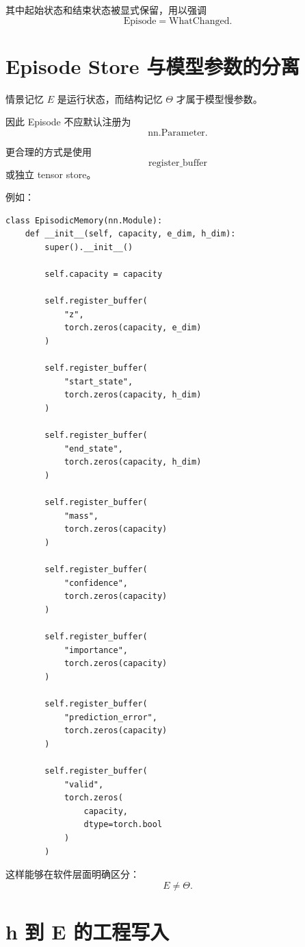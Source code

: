 其中起始状态和结束状态被显式保留，用以强调
\[
\boxed{
\mathrm{Episode}
=
\mathrm{WhatChanged}.
}
\]

\section{Episode Store 与模型参数的分离}

情景记忆 $E$ 是运行状态，而结构记忆 $\Theta$ 才属于模型慢参数。

因此 Episode 不应默认注册为
\[
\mathrm{nn.Parameter}.
\]

更合理的方式是使用
\[
\mathrm{register\_buffer}
\]
或独立 tensor store。

例如：

\begin{verbatim}
class EpisodicMemory(nn.Module):
    def __init__(self, capacity, e_dim, h_dim):
        super().__init__()

        self.capacity = capacity

        self.register_buffer(
            "z",
            torch.zeros(capacity, e_dim)
        )

        self.register_buffer(
            "start_state",
            torch.zeros(capacity, h_dim)
        )

        self.register_buffer(
            "end_state",
            torch.zeros(capacity, h_dim)
        )

        self.register_buffer(
            "mass",
            torch.zeros(capacity)
        )

        self.register_buffer(
            "confidence",
            torch.zeros(capacity)
        )

        self.register_buffer(
            "importance",
            torch.zeros(capacity)
        )

        self.register_buffer(
            "prediction_error",
            torch.zeros(capacity)
        )

        self.register_buffer(
            "valid",
            torch.zeros(
                capacity,
                dtype=torch.bool
            )
        )
\end{verbatim}

这样能够在软件层面明确区分：
\[
\boxed{
E
\neq
\Theta.
}
\]

\section{h 到 E 的工程写入}

